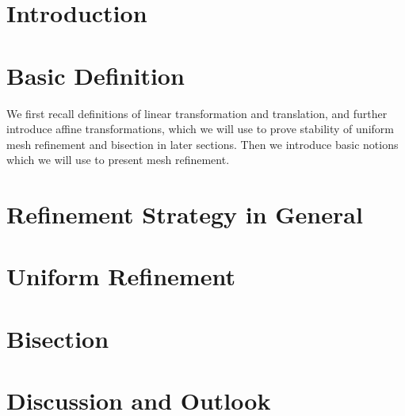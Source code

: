 \documentclass[english]{article}
\begin{document}
  

  \section{Introduction}
  

  \section{Basic Definition}
    We first recall definitions of linear transformation and translation, and further introduce affine transformations, which we will use to prove stability of uniform mesh refinement and bisection in later sections. Then we introduce basic notions which we will use to present mesh refinement.

    
    
    
    


  \section{Refinement Strategy in General}
    

  \section{Uniform Refinement}
    

  \section{Bisection}
    

  \section{Discussion and Outlook}
    

  \newpage
  
  
    
\end{document}
